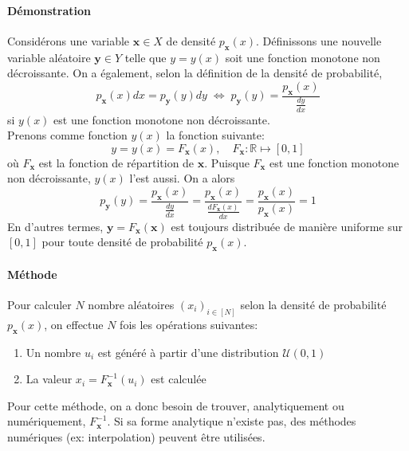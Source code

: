 \documentclass[a4paper]{article}
\begin{document}
\paragraph{Démonstration}
Considérons une variable \(\bm x\in X\) de densité
\(p_{\bm x}(x)\). Définissons une nouvelle variable aléatoire
\(\bm y\in Y\) telle que \(y=y(x)\) soit une fonction monotone non
décroissante. On a également, selon la définition de la densité de
probabilité,
\[
	p_{\bm x}(x)dx=p_{\bm y}(y)dy \;\Leftrightarrow\;
	p_{\bm y}(y) = \frac{p_{\bm x}(x)}{\frac{dy}{dx}}
\]
si \(y(x)\) est une fonction monotone non décroissante.\\
Prenons comme fonction \(y(x)\) la fonction suivante:
\[y=y(x)=F_{\bm x}(x),\quad F_{\bm x}:\mathbb{R}\mapsto[0,1]\]
où \(F_{\bm x}\) est la fonction de répartition de \(\bm x\).
Puisque \(F_{\bm x}\) est une fonction monotone non décroissante,
\(y(x)\) l'est aussi.
On a alors
\[
	p_{\bm y}(y) = \frac{p_{\bm x}(x)}{\frac{dy}{dx}}=
	\frac{p_{\bm x}(x)}{\frac{dF_{\bm x}(x)}{dx}}=
	\frac{p_{\bm x}(x)}{p_{\bm x}(x)}=1
\]
En d'autres termes, \(\bm y=F_{\bm x}(\bm x)\) est toujours
distribuée de manière uniforme sur \([0,1]\) pour toute densité de
probabilité \(p_{\bm x}(x)\).
\paragraph{Méthode} Pour calculer \(N\) nombre aléatoires
\((x_i)_{i\in[N]}\) selon la densité de probabilité \(p_{\bm x}(x)\),
on effectue \(N\) fois les opérations suivantes:
\begin{enumerate}
	\item Un nombre \(u_i\) est généré à partir d'une distribution
		\(\mathcal U(0,1)\)
	\item La valeur \(x_i=F^{-1}_{\bm x}(u_i)\) est calculée
\end{enumerate}
Pour cette méthode, on a donc besoin de trouver, analytiquement ou
numériquement, \(F^{-1}_{\bm x}\). Si sa forme analytique n'existe pas,
des méthodes numériques (ex: interpolation) peuvent être utilisées.
\end{document}
